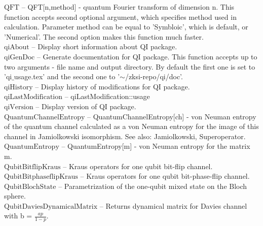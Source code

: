 \documentclass[a4paper,10pt]{scrartcl}
\begin{document}
\textbf{$ \text{QFT} $ }-- QFT[n,method] - quantum Fourier transform of dimension n. This function accepts second optional argument, which specifies method used in calculation. Parameter method can be equal to 'Symbloic', which is default, or 'Numerical'. The second option makes this function much faster.$  $\\

\textbf{$ \text{qiAbout} $ }-- Display short information about QI package.$  $\\

\textbf{$ \text{qiGenDoc} $ }-- Generate documentation for QI package. This function accepts up to two arguments - file name and output directory. By default the first one is set to 'qi$\_$usage.tex' and the second one to '$\sim $/zksi-repo/qi/doc'.$  $\\

\textbf{$ \text{qiHistory} $ }-- Display history of modifications for QI package.$  $\\

\textbf{$ \text{qiLastModification} $ }-- qiLastModification$ \text{::} $usage$  $\\

\textbf{$ \text{qiVersion} $ }-- Display version of QI package.$  $\\

\textbf{$ \text{QuantumChannelEntropy} $ }-- QuantumChannelEntropy[ch] - von Neuman entropy of the quantum channel calculated as a von Neuman entropy for the image of this channel in Jamiolkowski isomorphism. See also: Jamiolkowski, Superoperator.$  $\\

\textbf{$ \text{QuantumEntropy} $ }-- QuantumEntropy[m] - von Neuman entropy for the matrix m.$  $\\

\textbf{$ \text{QubitBitflipKraus} $ }-- Kraus operators for one qubit bit-flip channel.$  $\\

\textbf{$ \text{QubitBitphaseflipKraus} $ }-- Kraus operators for one qubit bit-phase-flip channel.$  $\\

\textbf{$ \text{QubitBlochState} $ }-- Parametrization of the one-qubit mixed state on the Bloch sphere.$  $\\

\textbf{$ \text{QubitDaviesDynamicalMatrix} $ }-- Returns dynamical matrix for Davies channel with b = $ \frac{a p}{1-p}. $\\
\end{document}
